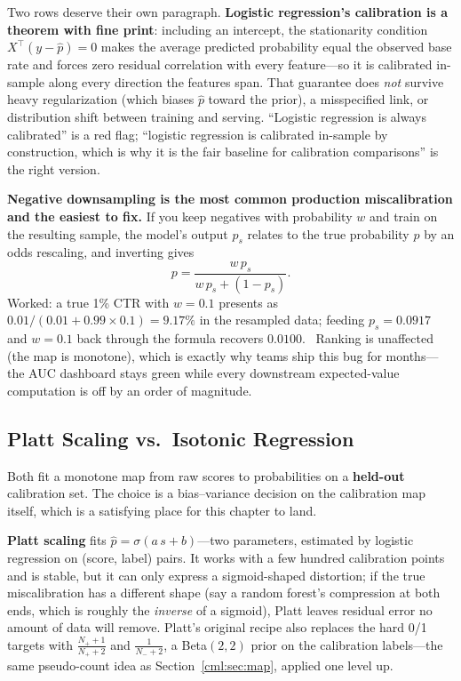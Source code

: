 Two rows deserve their own paragraph. \textbf{Logistic regression's calibration is a theorem with fine print}: including an intercept, the stationarity condition $X^\top(y - \hat p) = 0$ makes the average predicted probability equal the observed base rate and forces zero residual correlation with every feature---so it is calibrated in-sample along every direction the features span. That guarantee does \textit{not} survive heavy regularization (which biases $\hat p$ toward the prior), a misspecified link, or distribution shift between training and serving. ``Logistic regression is always calibrated'' is a red flag; ``logistic regression is calibrated in-sample by construction, which is why it is the fair baseline for calibration comparisons'' is the right version.

\textbf{Negative downsampling is the most common production miscalibration and the easiest to fix.} If you keep negatives with probability $w$ and train on the resulting sample, the model's output $p_s$ relates to the true probability $p$ by an odds rescaling, and inverting gives
\begin{equation}
p = \frac{w\,p_s}{w\,p_s + (1 - p_s)} .
\end{equation}
Worked: a true 1\% CTR with $w = 0.1$ presents as $0.01/(0.01 + 0.99 \times 0.1) = 9.17\%$ in the resampled data; feeding $p_s = 0.0917$ and $w = 0.1$ back through the formula recovers $0.0100$. \checkmark\ Ranking is unaffected (the map is monotone), which is exactly why teams ship this bug for months---the AUC dashboard stays green while every downstream expected-value computation is off by an order of magnitude.

\subsection{Platt Scaling vs.\ Isotonic Regression}

Both fit a monotone map from raw scores to probabilities on a \textbf{held-out} calibration set. The choice is a bias--variance decision on the calibration map itself, which is a satisfying place for this chapter to land.

\textbf{Platt scaling} fits $\hat p = \sigma(a\,s + b)$---two parameters, estimated by logistic regression on (score, label) pairs. It works with a few hundred calibration points and is stable, but it can only express a sigmoid-shaped distortion; if the true miscalibration has a different shape (say a random forest's compression at both ends, which is roughly the \textit{inverse} of a sigmoid), Platt leaves residual error no amount of data will remove. Platt's original recipe also replaces the hard 0/1 targets with $\frac{N_+ + 1}{N_+ + 2}$ and $\frac{1}{N_- + 2}$, a Beta$(2,2)$ prior on the calibration labels---the same pseudo-count idea as Section~\ref{cml:sec:map}, applied one level up.

